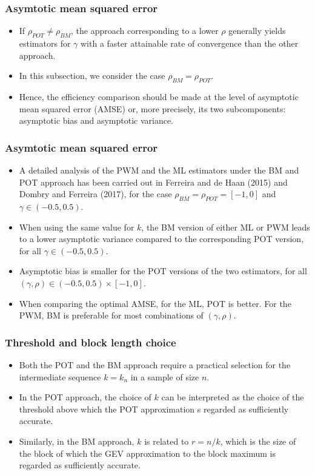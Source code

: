\documentclass{beamer}
\begin{document}
\begin{frame}
    \frametitle{Asymtotic mean squared error}
\begin{itemize}
    \item If $\rho_{POT}\ne \rho_{BM}$, the approach corresponding to a lower $\rho$ generally yields estimators for $\gamma$ with a faster attainable rate of convergence than the other approach.
    \item In this subsection, we consider the case $\rho_{BM}=\rho_{POT}$.
    \item Hence, the efficiency comparison should be made at the level of asymptotic mean squared error
    (AMSE) or, more precisely, its two subcomponents: asymptotic bias and asymptotic variance.
\end{itemize}
    

\end{frame}

\begin{frame}
    \frametitle{Asymtotic mean squared error}

    \begin{itemize}
        \item A detailed analysis of the PWM and the ML estimators under the BM and POT approach has
        been carried out in Ferreira and de Haan (2015) and Dombry and Ferreira (2017), for the case $\rho_{BM}=\rho_{POT}=[-1,0]$ and $\gamma\in (-0.5,0.5)$.
        \item When using the same value for $k$, the BM version of either ML or PWM     leads to a lower asymptotic         variance compared to the corresponding POT version, for all $\gamma\in (-0.5,0.5)$.
        \item Asymptotic bias is smaller for the POT versions of the two estimators, for all $(\gamma,\rho)\in (-0.5,0.5)\times [-1,0]$.
        \item When comparing the optimal AMSE, for the ML, POT is better. For the PWM, BM is preferable for most combinations of $(\gamma,\rho)$.
    \end{itemize}

\end{frame}


\begin{frame}
    \frametitle{Threshold and block length choice}
\begin{itemize}
    \item Both the POT and the BM approach require a practical selection for the intermediate sequence $k=k_n$ in a sample of size $n$.
    \item In the POT approach, the choice of $k$ can be interpreted as
    the choice of the threshold above which the POT approximation s regarded as sufficiently
    accurate.
    \item Similarly, in the BM approach, $k$ is related to $r=n/k$, which is the size of the block
    of which the GEV approximation to the block maximum is regarded as sufficiently accurate.
\end{itemize}
    

\end{frame}
\end{document}
